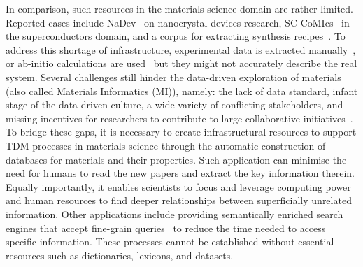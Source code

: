 \documentclass[fleqn,10pt]{wlscirep}
\begin{document}
In comparison, such resources in the materials science domain are rather limited. 
Reported cases include NaDev~\cite{Dieb2016} on nanocrystal devices research, SC-CoMIcs~\cite{yamaguchi-etal-2020-sc} in the superconductors domain, and a corpus for extracting synthesis recipes~\cite{kononova_text-mined_2019}.
To address this shortage of infrastructure, experimental data is extracted manually~\cite{doi:10.1021/cm400893e}, or ab-initio calculations are used~\cite{Jain2013CommentaryTM_materialsProject} but they might not accurately describe the real system.
Several challenges still hinder the data-driven exploration of materials (also called Materials Informatics (MI)), namely: the lack of data standard, infant stage of the data-driven culture, a wide variety of conflicting stakeholders, and missing incentives for researchers to contribute to large collaborative initiatives~\cite{Hill2016MaterialsSW}. 
To bridge these gaps, it is necessary to create infrastructural resources to support TDM processes in materials science through the automatic construction of databases for materials and their properties. 
Such application can minimise the need for humans to read the new papers and extract the key information therein. 
Equally importantly, it enables scientists to focus and leverage computing power and human resources to find deeper relationships between superficially unrelated information. 
Other applications include providing semantically enriched search engines that accept fine-grain queries~\cite{Liu2019SurfaceMR} to reduce the time needed to access specific information. 
These processes cannot be established without essential resources such as dictionaries, lexicons, and datasets. 
\end{document}
